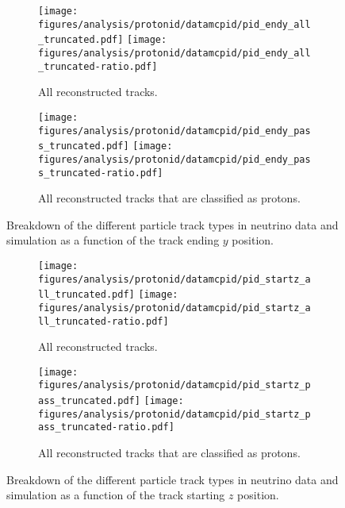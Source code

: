     \begin{figure}[h]
      \centering
      \begin{subfigure}[t]{2.5in}
        \texttt{[image: figures/analysis/protonid/datamcpid/pid\_endy\_all\_truncated.pdf]}
        \texttt{[image: figures/analysis/protonid/datamcpid/pid\_endy\_all\_truncated-ratio.pdf]}
        \caption{All reconstructed tracks.}
      \end{subfigure}
      \hspace{2pt}
      \begin{subfigure}[t]{2.5in}
        \texttt{[image: figures/analysis/protonid/datamcpid/pid\_endy\_pass\_truncated.pdf]}
        \texttt{[image: figures/analysis/protonid/datamcpid/pid\_endy\_pass\_truncated-ratio.pdf]}
        \caption{All reconstructed tracks that are classified as protons.}
      \end{subfigure}
      \caption{Breakdown of the different particle track types in neutrino data
      and simulation as a function of the track ending $y$ position.}
      \label{fig:pidendy}
    \end{figure}
    \begin{figure}[h]
      \centering
      \begin{subfigure}[t]{2.5in}
        \texttt{[image: figures/analysis/protonid/datamcpid/pid\_startz\_all\_truncated.pdf]}
        \texttt{[image: figures/analysis/protonid/datamcpid/pid\_startz\_all\_truncated-ratio.pdf]}
        \caption{All reconstructed tracks.}
      \end{subfigure}
      \hspace{2pt}
      \begin{subfigure}[t]{2.5in}
        \texttt{[image: figures/analysis/protonid/datamcpid/pid\_startz\_pass\_truncated.pdf]}
        \texttt{[image: figures/analysis/protonid/datamcpid/pid\_startz\_pass\_truncated-ratio.pdf]}
        \caption{All reconstructed tracks that are classified as protons.}
      \end{subfigure}
      \caption{Breakdown of the different particle track types in neutrino data
      and simulation as a function of the track starting $z$ position.}
      \label{fig:pidstartz}
    \end{figure}
